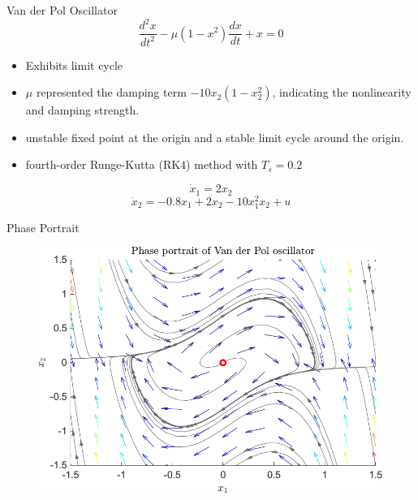 %     

%     


\begin{frame}{Van der Pol Oscillator \cite{korda2020optimal}}
    \[ \frac{{d^2x}}{{dt^2}} - \mu (1 - x^2) \frac{{dx}}{{dt}} + x = 0 \]
    \begin{itemize}
        \item Exhibits limit cycle
        \item  \( \mu \) represented the damping term \( -10x_2(1 - x_2^2) \), indicating the nonlinearity and damping strength.
        \item unstable fixed point at the origin and a stable limit cycle around the origin.
        \item fourth-order Runge-Kutta (RK4) method with $T_s = 0.2$
    \end{itemize}
    
    \[         \dot{x}_1 = 2x_2 \]
      \[  \dot{x}_2 = -0.8x_1 + 2x_2 - 10x_1^2x_2 + u \]
        
\end{frame}

\begin{frame}{Phase Portrait}
%     
    \begin{figure}
    \centering
    \includegraphics[width=0.6\columnwidth]{figures/vdp/phase_portarit}
    \label{fig:pp_vdp}
\end{figure}
\end{frame}

